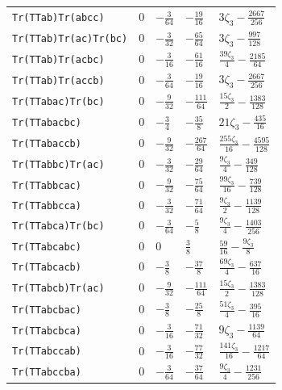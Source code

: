 \begin{center}
\begin{longtable}{lllll}
\texttt{Tr(TTab)Tr(abcc)} & $0$ & $- \frac{3}{64}$ & $- \frac{19}{16}$ & $3 \zeta_3 - \frac{2667}{256}$\\
\texttt{Tr(TTab)Tr(ac)Tr(bc)} & $0$ & $- \frac{3}{32}$ & $- \frac{65}{64}$ & $3 \zeta_3 - \frac{997}{128}$\\
\texttt{Tr(TTab)Tr(acbc)} & $0$ & $- \frac{3}{16}$ & $- \frac{61}{16}$ & $\frac{39 \zeta_3}{4} - \frac{2185}{64}$\\
\texttt{Tr(TTab)Tr(accb)} & $0$ & $- \frac{3}{64}$ & $- \frac{19}{16}$ & $3 \zeta_3 - \frac{2667}{256}$\\
\texttt{Tr(TTabac)Tr(bc)} & $0$ & $- \frac{9}{32}$ & $- \frac{111}{64}$ & $\frac{15 \zeta_3}{2} - \frac{1383}{128}$\\
\texttt{Tr(TTabacbc)} & $0$ & $- \frac{3}{4}$ & $- \frac{35}{8}$ & $21 \zeta_3 - \frac{435}{16}$\\
\texttt{Tr(TTabaccb)} & $0$ & $- \frac{9}{32}$ & $- \frac{267}{64}$ & $\frac{255 \zeta_3}{16} - \frac{4595}{128}$\\
\texttt{Tr(TTabbc)Tr(ac)} & $0$ & $- \frac{3}{32}$ & $- \frac{29}{64}$ & $\frac{9 \zeta_3}{4} - \frac{349}{128}$\\
\texttt{Tr(TTabbcac)} & $0$ & $- \frac{9}{32}$ & $- \frac{75}{64}$ & $\frac{99 \zeta_3}{16} - \frac{739}{128}$\\
\texttt{Tr(TTabbcca)} & $0$ & $- \frac{3}{32}$ & $- \frac{71}{64}$ & $\frac{9 \zeta_3}{2} - \frac{1139}{128}$\\
\texttt{Tr(TTabca)Tr(bc)} & $0$ & $- \frac{3}{64}$ & $- \frac{5}{8}$ & $\frac{9 \zeta_3}{4} - \frac{1403}{256}$\\
\texttt{Tr(TTabcabc)} & $0$ & $0$ & $\frac{3}{8}$ & $\frac{59}{16} - \frac{9 \zeta_3}{8}$\\
\texttt{Tr(TTabcacb)} & $0$ & $- \frac{3}{8}$ & $- \frac{37}{8}$ & $\frac{69 \zeta_3}{4} - \frac{637}{16}$\\
\texttt{Tr(TTabcb)Tr(ac)} & $0$ & $- \frac{9}{32}$ & $- \frac{111}{64}$ & $\frac{15 \zeta_3}{2} - \frac{1383}{128}$\\
\texttt{Tr(TTabcbac)} & $0$ & $- \frac{3}{8}$ & $- \frac{25}{8}$ & $\frac{51 \zeta_3}{4} - \frac{395}{16}$\\
\texttt{Tr(TTabcbca)} & $0$ & $- \frac{3}{16}$ & $- \frac{71}{32}$ & $9 \zeta_3 - \frac{1139}{64}$\\
\texttt{Tr(TTabccab)} & $0$ & $- \frac{3}{16}$ & $- \frac{77}{32}$ & $\frac{141 \zeta_3}{16} - \frac{1217}{64}$\\
\texttt{Tr(TTabccba)} & $0$ & $- \frac{3}{64}$ & $- \frac{37}{64}$ & $\frac{9 \zeta_3}{4} - \frac{1231}{256}$\\

\end{longtable}
\end{center}
